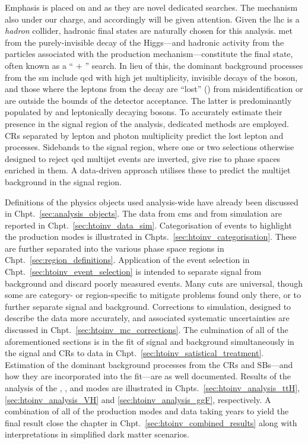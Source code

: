 Emphasis is placed on \ttH and \VH as they are novel dedicated searches. The \ggH mechanism also under our charge, and accordingly will be given attention. Given the \acrshort{lhc} is a \emph{hadron} collider, hadronic final states are naturally chosen for this analysis. \Gls{met} from the purely-invisible decay of the Higgs---and hadronic activity from the particles associated with the production mechanism---constitute the final state, often known as a `` $+$ \ptvecmiss'' search. In lieu of this, the dominant background processes from the \acrlong{sm} include \acrshort{qcd} with high \gls{jet} multiplicity, invisible decays of the \PZ boson, and those where the leptons from the decay are ``lost'' (\lostlepton) from misidentification or are outside the bounds of the detector acceptance. The latter is predominantly populated by \ttbar and leptonically decaying \PW bosons. To accurately estimate their presence in the signal region of the analysis, dedicated methods are employed. \Glspl{CR} separated by lepton and photon multiplicity predict the lost lepton and \ztonunu processes. Sidebands to the signal region, where one or two selections otherwise designed to reject \acrshort{qcd} multijet events are inverted, give rise to phase spaces enriched in them. A data-driven approach utilises these to predict the multijet background in the signal region.

Definitions of the physics objects used analysis-wide have already been discussed in Chpt.~\ref{sec:analysis_objects}. The data from \acrshort{cms} and from simulation are reported in Chpt.~\ref{sec:htoinv_data_sim}. Categorisation of events to highlight the production modes is illustrated in Chpts.~\ref{sec:htoinv_categorisation}. These are further separated into the various phase space regions in Chpt.~\ref{sec:region_definitions}. Application of the event selection in Chpt.~\ref{sec:htoinv_event_selection} is intended to separate signal from background and discard poorly measured events. Many cuts are universal, though some are category- or region-specific to mitigate problems found only there, or to further separate signal and background. Corrections to simulation, designed to describe the data more accurately, and associated systematic uncertainties are discussed in Chpt.~\ref{sec:htoinv_mc_corrections}. The culmination of all of the aforementioned sections is in the fit of signal and background simultaneously in the signal and \glspl{CR} to data in Chpt.~\ref{sec:htoinv_satistical_treatment}. Estimation of the dominant background processes from the \glspl{CR} and \glspl{SB}---and how they are incorporated into the fit---are as well documented. Results of the analysis of the \ttH, \VH, and \ggH modes are illustrated in Chpts.~\ref{sec:htoinv_analysis_ttH}, \ref{sec:htoinv_analysis_VH} and \ref{sec:htoinv_analysis_ggF}, respectively. A combination of all of the production modes and data taking years to yield the final result close the chapter in Chpt.~\ref{sec:htoinv_combined_results} along with interpretations in simplified dark matter scenarios.


